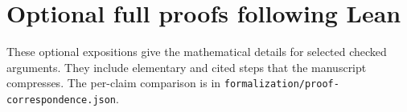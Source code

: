 \clearpage\section{Optional full proofs following Lean}\label{sec:lean-full-proofs}

These optional expositions give the mathematical details for selected checked arguments. They include elementary and cited steps that the manuscript compresses. The per-claim comparison is in \texttt{formalization/proof-correspondence.json}.






